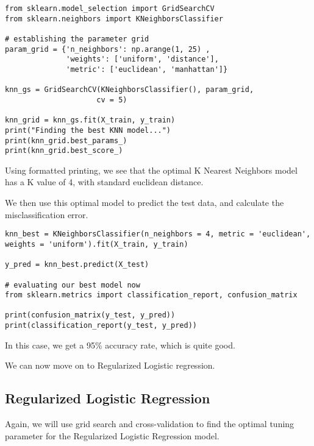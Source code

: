 \documentclass[12pt, letterpaper]{article}
\begin{document}
\begin{verbatim}
from sklearn.model_selection import GridSearchCV 
from sklearn.neighbors import KNeighborsClassifier 

# establishing the parameter grid 
param_grid = {'n_neighbors': np.arange(1, 25) , 
              'weights': ['uniform', 'distance'], 
              'metric': ['euclidean', 'manhattan']}

knn_gs = GridSearchCV(KNeighborsClassifier(), param_grid, 
                     cv = 5)

knn_grid = knn_gs.fit(X_train, y_train)
print("Finding the best KNN model...")
print(knn_grid.best_params_)
print(knn_grid.best_score_) 
\end{verbatim} 

Using formatted printing, we see that the optimal K Nearest Neighbors model has a K value of 4, with standard euclidean distance. 

We then use this optimal model to predict the test data, and calculate the misclassification error. 

\begin{verbatim}
knn_best = KNeighborsClassifier(n_neighbors = 4, metric = 'euclidean', weights = 'uniform').fit(X_train, y_train)

y_pred = knn_best.predict(X_test)

# evaluating our best model now 
from sklearn.metrics import classification_report, confusion_matrix 

print(confusion_matrix(y_test, y_pred)) 
print(classification_report(y_test, y_pred)) 
\end{verbatim} 

In this case, we get a 95\% accuracy rate, which is quite good.  

We can now move on to Regularized Logistic regression. 

\subsection{Regularized Logistic Regression} 

Again, we will use grid search and cross-validation to find the optimal tuning parameter for the Regularized Logistic Regression model. 
\end{document}
